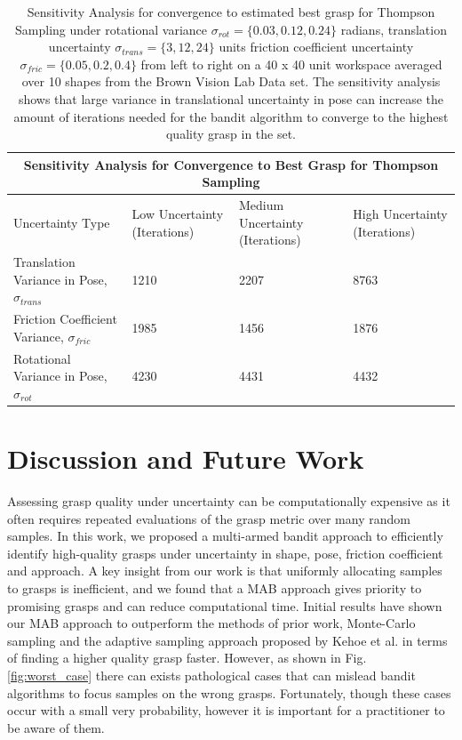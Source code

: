 \documentclass[a4paper, 10pt, conference]{ieeeconf}      %
\begin{document}
\begin{table}[t]
\centering
\begin{tabular}{ |p{4.5cm}||p{2cm}|p{2.5cm}|p{2cm}|  }
 \hline
 \multicolumn{4}{|c|}{Sensitivity Analysis for Convergence to Best Grasp for Thompson Sampling} \\
 \hline
Uncertainty Type & Low Uncertainty (Iterations) & Medium Uncertainty (Iterations) & High Uncertainty (Iterations)\\
 \hline
Translation Variance in Pose, $\sigma_{trans}$ & 1210    & 2207 &  8763\\
Friction Coefficient Variance, $\sigma_{fric}$ &  1985  & 1456   & 1876\\
Rotational Variance in Pose, $\sigma_{rot}$ & 4230 & 4431 &  4432\\
 \hline
\end{tabular}
   \caption { \footnotesize  Sensitivity Analysis for convergence to estimated best grasp for Thompson Sampling under rotational variance $\sigma_{rot} = \lbrace 0.03,0.12, 0.24 \rbrace$ radians,  translation uncertainty $\sigma_{trans} = \lbrace 3, 12, 24 \rbrace$ units  friction coefficient uncertainty $\sigma_{fric} = \lbrace 0.05,0.2, 0.4 \rbrace$  from left to right on a 40 x 40 unit workspace averaged over 10 shapes from the Brown Vision Lab Data set. The sensitivity analysis shows that large variance in translational uncertainty in pose can increase the amount of iterations needed for the bandit algorithm to converge to the highest quality grasp in the set. 
   }
\vspace*{-20pt}
\end{table}


\section{Discussion and Future Work } 

Assessing grasp quality under  uncertainty can be computationally expensive as it often requires repeated evaluations of the grasp metric over many random samples.
In this work, we proposed a multi-armed bandit approach to efficiently identify high-quality grasps under uncertainty in shape, pose, friction coefficient and approach. 
A key insight from our work is that uniformly allocating samples to grasps is inefficient, and we found that a MAB approach gives priority to promising grasps and can reduce computational time. Initial results have shown our MAB approach to outperform the methods of prior work, Monte-Carlo sampling and the adaptive sampling approach proposed by Kehoe et al. \cite{kehoe2012estimating} in terms of finding a higher quality grasp faster. 
 However, as shown in Fig. \ref{fig:worst_case} there can exists pathological cases that can mislead bandit algorithms to focus samples on the wrong grasps. Fortunately, though these cases occur with a small very probability, however it is important for a practitioner to be aware of them. 
\end{document}
